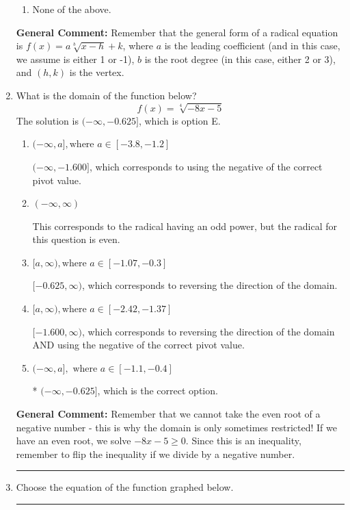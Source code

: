 \documentclass{extbook}[14pt]
\newcommand{\litem}[1]{\item #1

\rule{\textwidth}{0.4pt}}
\begin{document}
\begin{enumerate}
{\begin{enumerate}[label=\Alph*.]
\item None of the above.\end{enumerate}
\textbf{General Comment:} Remember that the general form of a radical equation is $ f(x) = a \sqrt[b]{x - h} + k $, where $a$ is the leading coefficient (and in this case, we assume is either 1 or -1), $b$ is the root degree (in this case, either 2 or 3), and $(h, k)$ is the vertex.
}
\litem{
What is the domain of the function below?
\[ f(x) = \sqrt[4]{-8 x - 5} \]The solution is \( (-\infty, -0.625] \), which is option E.\begin{enumerate}[label=\Alph*.]
\item \( (-\infty, a], \text{where } a \in [-3.8, -1.2] \)

$(-\infty, -1.600]$, which corresponds to using the negative of the correct pivot value.
\item \( (-\infty, \infty) \)

This corresponds to the radical having an odd power, but the radical for this question is even.
\item \( [a, \infty), \text{where } a \in [-1.07, -0.3] \)

 $[-0.625, \infty)$, which corresponds to reversing the direction of the domain.
\item \( [a, \infty), \text{where } a \in [-2.42, -1.37] \)

$[-1.600, \infty)$, which corresponds to reversing the direction of the domain AND using the negative of the correct pivot value.
\item \( (-\infty, a], \text{ where } a \in [-1.1, -0.4] \)

* $(-\infty, -0.625]$, which is the correct option.
\end{enumerate}

\textbf{General Comment:} Remember that we cannot take the even root of a negative number - this is why the domain is only sometimes restricted! If we have an even root, we solve $-8 x - 5 \geq 0$. Since this is an inequality, remember to flip the inequality if we divide by a negative number.
}
\litem{
Choose the equation of the function graphed below.

}
\end{enumerate}
\end{document}
